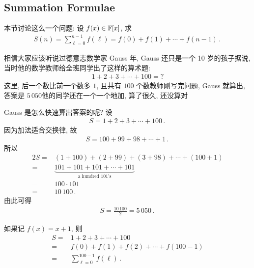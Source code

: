 \subsection*{Summation Formulae}

本节讨论这么一个问题: 设 $f(x) \in \mathbb{F}[x]$, 求
\begin{align*}
    S(n) = \sum_{\ell = 0}^{n - 1} f(\ell) = f(0) + f(1) + \cdots + f(n - 1) \period
\end{align*}

\begin{example}
    相信大家应该听说过德意志数学家 Gauss 年, Gauss 还只是一个 10 岁的孩子\period 据说, 当时他的数学教师给全班同学出了这样的算术题:
    \begin{align*}
        1 + 2 + 3 + \cdots + 100 = ?
    \end{align*}
    这里, 后一个数比前一个数多 $1$, 且共有 $100$ 个数\period 教师刚写完问题, Gauss 就算出, 答案是 $5\,050$\period 他的同学还在一个一个地加, 算了很久, 还没算对\period

    Gauss 是怎么快速算出答案的呢? 设
    \begin{align*}
        S = 1 + 2 + 3 + \cdots + 100 \period
    \end{align*}
    因为加法适合交换律, 故
    \begin{align*}
        S = 100 + 99 + 98 + \cdots + 1 \period
    \end{align*}
    所以
    \begin{align*}
        2S
        = {} & (1 + 100) + (2 + 99) + (3 + 98) + \cdots + (100 + 1) \\
        = {} & \underbrace{101 + 101 + 101 + \cdots + 101}
        _{\text{a hundred $101$'s}}                                 \\
        = {} & 100 \cdot 101                                        \\
        = {} & 10\,100 \period
    \end{align*}
    由此可得
    \begin{align*}
        S = \frac{10\,100}{2} = 5\,050 \period
    \end{align*}

    如果记 $f(x) = x + 1$, 则
    \begin{align*}
        S
        = {} & 1 + 2 + 3 + \cdots + 100                  \\
        = {} & f(0) + f(1) + f(2) + \cdots + f(100 - 1)  \\
        = {} & \sum_{\ell = 0}^{100 - 1} f(\ell) \period
    \end{align*}


\end{example}
